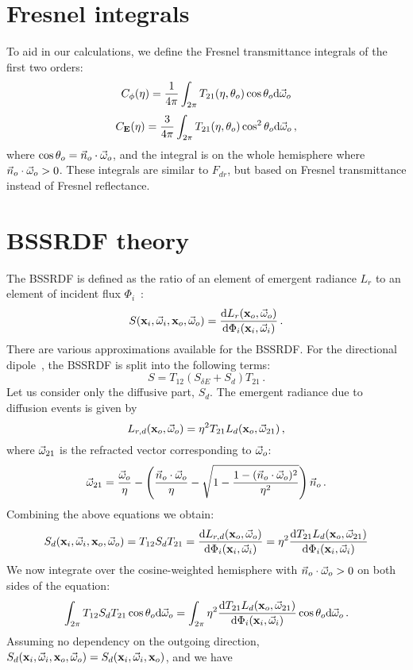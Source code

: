 \documentclass[10pt,a4paper]{article}
\begin{document}
\section{Fresnel integrals}
To aid in our calculations, we define the Fresnel transmittance integrals of the first two orders:
$$
C_{\phi}(\eta) = \frac{1}{4\pi}\int_{2\pi} T_{21}(\eta,\theta_o)\cos \theta_o \text{d} \vec{\omega}_o
$$
$$
C_{\mathbf{E}}(\eta) = \frac{3}{4\pi}\int_{2\pi} T_{21}(\eta,\theta_o)\cos^2 \theta_o \text{d} \vec{\omega}_o \, ,
$$
where $\cos\theta_o = \vec{n}_o \cdot \vec{\omega}_o$, and the integral is on the whole hemisphere where $\vec{n}_o \cdot \vec{\omega}_o > 0$. These integrals are similar to $F_{dr}$, but based on Fresnel transmittance instead of Fresnel reflectance.

\section{BSSRDF theory}
The BSSRDF is defined as the ratio of an element of emergent radiance $L_r$ to an element of incident flux $\Phi_i$~\cite{nicodemus77}:
$$
S(\mathbf{x}_i, \vec{\omega}_i, \mathbf{x}_o, \vec{\omega}_o) = \frac{\text{d} L_r(\mathbf{x}_o, \vec{\omega}_o)}{\text{d} \Phi_i(\mathbf{x}_i, \vec{\omega}_i)} \, .
$$
There are various approximations available for the BSSRDF. For the directional dipole~\cite{frisvad14directional}, the BSSRDF is split into the following terms:
$$
S = T_{12} (S_{\delta E} + S_d) T_{21} \, .
$$
Let us consider only the diffusive part, $S_d$. The emergent radiance due to diffusion events is given by
$$
L_{r,d}(\mathbf{x}_o, \vec{\omega}_o) = \eta^2 T_{21} L_{d}(\mathbf{x}_o, \vec{\omega}_{21}) \, ,
$$
where $\vec{\omega}_{21}$ is the refracted vector corresponding to $\vec{\omega}_{o}$:
$$
\vec{\omega}_{21} = \frac{\vec{\omega}_o}{\eta} - \left(\frac{\vec{n}_o \cdot \vec{\omega}_o}{\eta} - \sqrt{1 - \frac{1 - (\vec{n}_o \cdot \vec{\omega}_o
)^2}{\eta^2}}\right) \vec{n}_o \, .
$$
Combining the above equations we obtain:
$$
S_d(\mathbf{x}_i, \vec{\omega}_i, \mathbf{x}_o, \vec{\omega}_o) =  T_{12} S_d T_{21} = \frac{\text{d} L_{r,d}(\mathbf{x}_o, \vec{\omega}_o)}{\text{d} \Phi_i(\mathbf{x}_i, \vec{\omega}_i)} = \eta^2 \frac{\text{d} T_{21}  L_{d}(\mathbf{x}_o, \vec{\omega}_{21}) }{\text{d} \Phi_i(\mathbf{x}_i, \vec{\omega}_i)}
$$
We now integrate over the cosine-weighted hemisphere with $\vec{n}_o \cdot \vec{\omega}_o > 0$ on both sides of the equation:
$$
\int_{2\pi} T_{12} S_d T_{21} \cos \theta_o \text{d} \vec{\omega}_o =  \int_{2\pi} \eta^2 \frac{\text{d} T_{21}  L_{d}(\mathbf{x}_o, \vec{\omega}_{21}) }{\text{d} \Phi_i(\mathbf{x}_i, \vec{\omega}_i)} \cos \theta_o \text{d} \vec{\omega}_o \, .
$$
Assuming no dependency on the outgoing direction, $S_d(\mathbf{x}_i, \vec{\omega}_i, \mathbf{x}_o, \vec{\omega}_o) = S_d(\mathbf{x}_i, \vec{\omega}_i, \mathbf{x}_o)$, and we have
\end{document}
